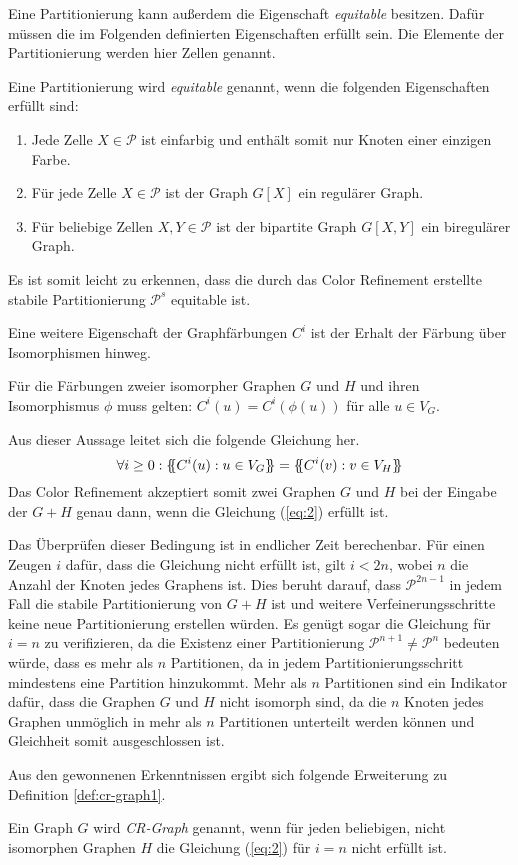 Eine Partitionierung kann außerdem die Eigenschaft \emph{equitable} besitzen.
Dafür müssen die im Folgenden definierten Eigenschaften erfüllt sein.
Die Elemente der Partitionierung werden hier Zellen genannt.
\begin{Definition}
	Eine Partitionierung wird \emph{equitable} genannt, wenn die folgenden Eigenschaften erfüllt sind:
	\begin{enumerate}[label=(\alph*)]
		\item Jede Zelle $X\in \mathcal{P}$ ist einfarbig und enthält somit nur Knoten einer einzigen Farbe.
		\item Für jede Zelle $X\in \mathcal{P}$ ist der Graph $G[X]$ ein regulärer Graph.
		\item Für beliebige Zellen $X,Y\in \mathcal{P}$ ist der bipartite Graph $G[X,Y]$ ein biregulärer Graph.
	\end{enumerate}
\end{Definition}
Es ist somit leicht zu erkennen, dass die durch das Color Refinement erstellte stabile Partitionierung $\mathcal{P}^s$ equitable ist.

Eine weitere Eigenschaft der Graphfärbungen $C^i$ ist der Erhalt der Färbung über Isomorphismen hinweg.
\begin{Lemma}
	Für die Färbungen zweier isomorpher Graphen $G$ und $H$ und ihren Isomorphismus $\phi$ muss gelten: $C^i(u)=C^i(\phi (u))$ für alle $u\in V_G$.
	\label{lemma:faerbung_isomorphismus}
\end{Lemma}
Aus dieser Aussage leitet sich die folgende Gleichung her.
\begin{equation}
\forall i\geq 0:\{\mskip-5mu\{ C^i(u):u\in V_G\}\mskip-5mu\} =\{\mskip-5mu\{ C^i(v):v\in V_H\}\mskip-5mu\} 
\label{eq:2}
\end{equation}
Das Color Refinement akzeptiert somit zwei Graphen $G$ und $H$ bei der Eingabe der  $G+H$ genau dann, wenn die Gleichung (\ref{eq:2}) erfüllt ist.

Das Überprüfen dieser Bedingung ist in endlicher Zeit berechenbar.
Für einen Zeugen $i$ dafür, dass die Gleichung nicht erfüllt ist, gilt $i<2n$, wobei $n$ die Anzahl der Knoten jedes Graphens ist.
Dies beruht darauf, dass $\mathcal{P}^{2n-1}$ in jedem Fall die stabile Partitionierung von $G+H$ ist und weitere Verfeinerungsschritte keine neue Partitionierung erstellen würden.
Es genügt sogar die Gleichung für $i=n$ zu verifizieren, da die Existenz einer Partitionierung $\mathcal{P}^{n+1}\neq \mathcal{P}^n$ bedeuten würde, dass es mehr als $n$ Partitionen, da in jedem Partitionierungsschritt mindestens eine Partition hinzukommt.
Mehr als $n$ Partitionen sind ein Indikator dafür, dass die Graphen $G$ und $H$ nicht isomorph sind, da die $n$ Knoten jedes Graphen unmöglich in mehr als $n$ Partitionen unterteilt werden können und Gleichheit somit ausgeschlossen ist.

Aus den gewonnenen Erkenntnissen ergibt sich folgende Erweiterung zu Definition \ref{def:cr-graph1}.
\begin{Definition}
	Ein Graph $G$ wird \emph{CR-Graph} genannt, wenn für jeden beliebigen, nicht isomorphen Graphen $H$ die Gleichung (\ref{eq:2}) für $i=n$ nicht erfüllt ist.
	\label{def:cr-graph2}
\end{Definition}
